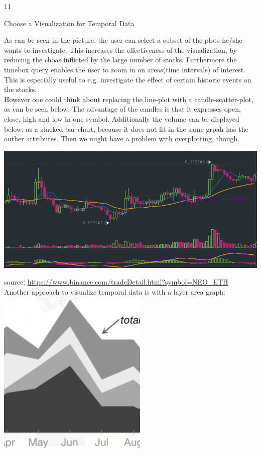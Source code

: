 \documentclass{article}
\begin{document}
\begin{ukon-infie}[31.01.18]{11}
\begin{exercise}[p=7]{Choose a Visualization for Temporal Data}
{						As can be seen in the picture, the user can select a subset of the plots he/she wants to investigate. This increases the effectiveness of the visualization, by reducing the choas inflicted by the large number of stocks. Furthermore the timebox query enables the user to zoom in on areas(time intervals) of interest. This is especially useful to e.g. investigate the effect of certain historic events on the stocks.\\

			
			However one could think about replacing the line-plot with a candle-scatter-plot, as can be seen below. The advantage of the candles is that it expresses open, close, high and low in one symbol. Additionally the volume can be displayed below, as a stacked bar chart, because it does not fit in the same grpah has the outher attributes. Then we might have a problem with overplotting, though.
			
						\includegraphics[scale=0.7]{candles.png}

			\tiny source: \url{https://www.binance.com/tradeDetail.html?symbol=NEO_ETH}
			\normalsize \\
			
			Another approach to visualize temporal data is with a layer area graph:\\
			
			\includegraphics[scale=0.7]{layered_area_graph.png}
			
}
\end{exercise}
\end{ukon-infie}
\end{document}
